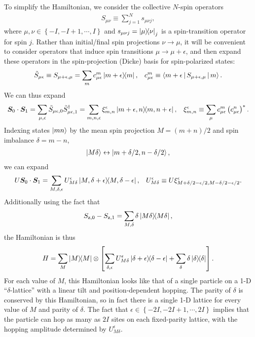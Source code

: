 \documentclass[nofootinbib,notitlepage,11pt]{revtex4-2}
\newcommand{\p}[1]{\left(#1\right)} %
\renewcommand{\sp}[1]{\left[#1\right]} %
\renewcommand{\set}[1]{\left\{#1\right\}} %
\newcommand{\bk}{\Braket} %
\renewcommand{\v}{\bm} %
\renewcommand{\c}{\cdot} %
\newcommand{\1}{\mathds{1}}
\newcommand{\z}{\text{z}}
\begin{document}
To simplify the Hamiltonian, we consider the collective $N$-spin operators
\begin{align}
  S_{\mu\nu} \equiv \sum_{j=1}^N s_{\mu\nu j},
\end{align}
where $\mu,\nu\in\set{-I,-I+1,\cdots,I}$ and $s_{\mu\nu j} = \op{\mu}{\nu}_j$ is a spin-transition operator for spin $j$.
Rather than initial/final spin projections $\nu\to\mu$, it will be convenient to consider operators that induce spin transitions $\mu\to\mu+\epsilon$, and then expand these operators in the spin-projection (Dicke) basis for spin-polarized states:
\begin{align}
  \tilde S_{\mu\epsilon} \equiv S_{\mu+\epsilon,\mu}
  = \sum_m c_{\mu\epsilon}^m \op{m+\epsilon}{m},
  &&
  c_{\mu\epsilon}^m \equiv \bk{m+\epsilon|S_{\mu+\epsilon,\mu}|m}.
\end{align}
We can thus expand
\begin{align}
  \v S_0 \c \v S_1
  = \sum_{\mu,\epsilon} \tilde S_{\mu\epsilon,0}
  \tilde S_{\mu\epsilon,1}^\dag
  = \sum_{m,n,\epsilon} \xi^\epsilon_{m,n}
  \op{m+\epsilon,n}{m,n+\epsilon},
  &&
  \xi^\epsilon_{m,n} \equiv
  \sum_\mu c^m_{\mu\epsilon} \p{c^n_{\mu\epsilon}}^*.
\end{align}
Indexing states $\ket{mn}$ by the mean spin projection $M=\p{m+n}/2$ and spin imbalance $\delta=m-n$,
\begin{align}
  \ket{M\delta} \leftrightarrow \ket{m+\delta/2,n-\delta/2},
\end{align}
we can expand
\begin{align}
  U \v S_0 \c \v S_1
  = \sum_{M,\delta,\epsilon} U_{M\delta}^\epsilon
  \op{M,\delta+\epsilon}{M,\delta-\epsilon},
  &&
  U_{M\delta}^\epsilon \equiv
  U \xi^\epsilon_{M+\delta/2-\epsilon/2,M-\delta/2-\epsilon/2}.
\end{align}
Additionally using the fact that
\begin{align}
  S_{\z,0} - S_{\z,1} = \sum_{M,\delta} \delta \op{M\delta},
\end{align}
the Hamiltonian is thus
\begin{align}
  H = \sum_M \op{M} \otimes
  \sp{\sum_{\delta,\epsilon} U_{M\delta}^\epsilon \op{\delta+\epsilon}{\delta-\epsilon}
    + \sum_\delta \delta \op\delta}.
\end{align}
For each value of $M$, this Hamiltonian looks like that of a single particle on a 1-D ``$\delta$-lattice'' with a linear tilt and position-dependent hopping.
The parity of $\delta$ is conserved by this Hamiltonian, so in fact there is a single 1-D lattice for every value of $M$ and parity of $\delta$.
The fact that $\epsilon\in\set{-2I,-2I+1,\cdots,2I}$ implies that the particle can hop as many as $2I$ sites on each fixed-parity lattice, with the hopping amplitude determined by $U_{M\delta}^\epsilon$.
\end{document}
